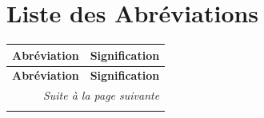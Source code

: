 ﻿%
\chapter*{Liste des Abréviations}

\begin{longtable}{@{}p{3cm}p{11cm}@{}}
\toprule
\textbf{Abréviation} & \textbf{Signification} \\
\midrule
\endfirsthead
\toprule
\textbf{Abréviation} & \textbf{Signification} \\
\midrule
\endhead
\midrule
\multicolumn{2}{r}{\textit{Suite à la page suivante}} \\
\bottomrule
\endfoot
\bottomrule
\endlastfoot


\end{longtable}
